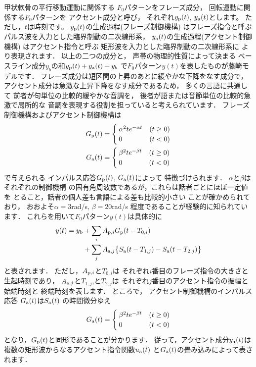 甲状軟骨の平行移動運動に関係する
$F_0$パターンをフレーズ成分，
回転運動に関係する$F_0$パターンを
アクセント成分と呼び，
それぞれ$y_{\rm p}(t)$, $y_{\rm a}(t)$とします。
ただし，$t$は時刻です。
$y_{\rm p}(t)$の生成過程(フレーズ制御機構)
はフレーズ指令と呼ぶ
パルス波を入力とした臨界制動の二次線形系，
$y_{\rm a}(t)$の生成過程(アクセント制御機構)
はアクセント指令と呼ぶ
矩形波を入力とした臨界制動の二次線形系に
より表現されます．
以上の二つの成分と，
声帯の物理的性質によって決まる
ベースライン成分$y_b$の和$y_{\rm p}(t)+y_{\rm a}(t)+y_b$
で$F_0$パターン$y(t)$を表したものが藤崎モデルです．
フレーズ成分は短区間の上昇のあとに緩やかな下降をなす成分で，
アクセント成分は急激な上昇下降をなす成分であるため，
多くの言語に共通して
前者が句単位の比較的緩やかな音調を，
後者が語または音節単位の比較的急激で局所的な
音調を表現する役割を担っていると考えられています．
フレーズ制御機構およびアクセント制御機構は
\begin{align}
G_{\rm p}(t)&=
\begin{cases}
\alpha^2 t e^{-\alpha t}&(t\ge 0)\\
0&(t<0)
\end{cases}
\\
G_{\rm a}(t)&=
\begin{cases}
\beta^2 t e^{-\beta t}&(t\ge 0)\\
0&(t<0)
\end{cases}
\end{align}
で与えられる
インパルス応答$G_{\rm p}(t)$, $G_{\rm a}(t)$によって
特徴づけられます．
$\alpha$と$\beta$はそれぞれの制御機構
の固有角周波数であるが，これらは話者ごとにほぼ一定値を
とること，話者の個人差も言語による差も比較的小さい
ことが確かめられており，
おおよそ$\alpha\!=\!3$rad/s, $\beta\!=\!20$rad/s
程度であることが経験的に知られています．
これらを用いて$F_0$パターン$y(t)$は具体的に
\begin{align}
\hspace{-0.0cm}
y(t) = y_{\rm b}
&+\sum_{i}A_{{\rm p},i}G_{\rm p}(t-T_{0,i})
\nonumber
\\
&+\sum_{j}A_{{\rm a},j}
\big\{S_{\rm a}(t-T_{1,j})-S_{\rm a}(t-T_{2,j})\big\}
\end{align}
と表されます．
ただし，$A_{{\rm p},i}$と$T_{0,i}$は
それぞれ$i$番目のフレーズ指令の大きさと生起時刻であり，
$A_{{\rm a},j}$と$T_{1,j}$,と$T_{2,j}$は
それぞれ$j$番目のアクセント指令の振幅と始端時刻と
終端時刻を表します．
ところで，
アクセント制御機構のインパルス応答
$G_{\rm a}(t)$は$S_{\rm a}(t)$
の時間微分ゆえ
\begin{align}
G_{\rm a}(t)=
\begin{cases}
\beta^2 t e^{-\beta t}&(t\ge 0)\\
0&(t<0)
\end{cases}
\end{align}
となり，$G_{\rm p}(t)$と同形であることが分かります．
従って，アクセント成分$y_{\rm a}(t)$は複数の矩形波からなるアクセント指令関数$u_{\rm a}(t)$
と$G_{\rm a}(t)$の畳み込みによって表されます．

